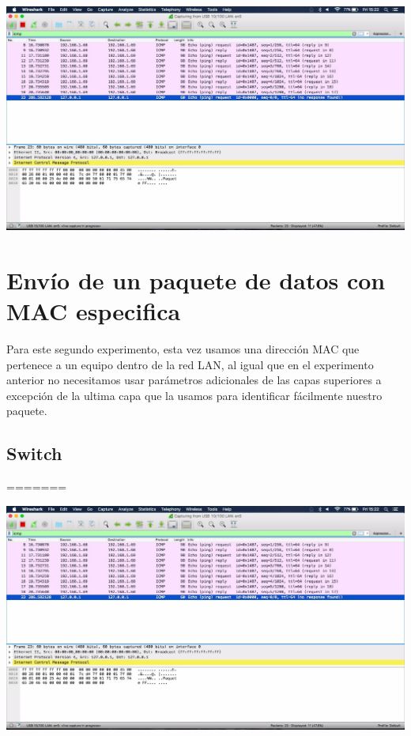 \documentclass[spanish]{udpreport}
\begin{document}
\begin{center}
	\includegraphics[scale=.3]{imagenes/Hub/FF.jpg}
\end{center}


\section{Envío de un paquete de datos con MAC especifica}

Para este segundo experimento, esta vez usamos una dirección MAC que pertenece a un equipo dentro de la red LAN, al igual que en el experimento anterior no necesitamos usar parámetros adicionales de las capas superiores a excepción de la ultima capa que la usamos para identificar fácilmente nuestro paquete.

\subsection{Switch}
=======
\begin{center}
	\includegraphics[scale=.37]{imagenes/Hub/Test_1_Wireshark.jpg}
\end{center}
\newpage
\end{document}
